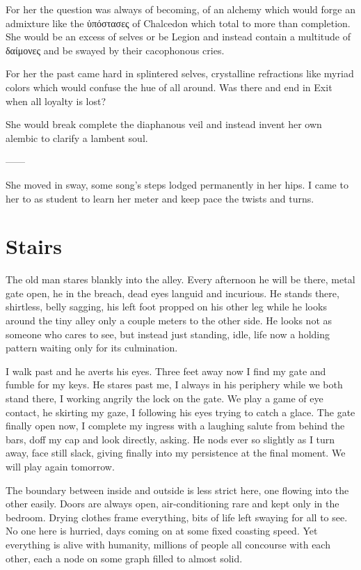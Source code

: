 \documentclass[ebook, 10pt, openright, onecolumn]{memoir}
\newcommand{\textgreek}[1]{\begingroup\fontencoding{LGR}\selectfont#1\endgroup}
\begin{document}
For her the question was always of becoming, of an alchemy which would forge an
admixture like the \textgreek{ὑπόστασες} of Chalcedon which total to more than
completion.  She would be an excess of selves or be Legion and instead contain a
multitude of \textgreek{δαίμονες} and be swayed by their cacophonous cries. 

For her the past came hard in splintered selves, crystalline refractions like
myriad colors which would confuse the hue of all around.  Was there and end in
Exit when all loyalty is lost?

She would break complete the diaphanous veil and instead invent her own alembic
to clarify a lambent soul.

------

She moved in sway, some song's steps lodged permanently in her hips.  I came to
her to as student to learn her meter and keep pace the twists and turns.  

\chapter{Stairs}
\label{cha:stairs}

The old man stares blankly into the alley. Every afternoon he will be there,
metal gate open, he in the breach, dead eyes languid and incurious.  He stands
there, shirtless, belly sagging, his left foot propped on his other leg while he
looks around the tiny alley only a couple meters to the other side.  He looks
not as someone who cares to see, but instead just standing, idle, life now a
holding pattern waiting only for its culmination.

I walk past and he averts his eyes.  Three feet away now I find my gate and
fumble for my keys.  He stares past me, I always in his periphery while we both
stand there, I working angrily the lock on the gate.  We play a game of eye
contact, he skirting my gaze, I following his eyes trying to catch a glace.  The
gate finally open now, I complete my ingress with a laughing salute from behind the
bars, doff my cap and look directly, asking.  He nods ever so slightly as I turn
away, face still slack, giving finally into my persistence at the final
moment.  We will play again tomorrow. 

The boundary between inside and outside is less strict here, one flowing into
the other easily.  Doors are always open, air-conditioning rare and kept only in
the bedroom.  Drying clothes frame everything, bits of life left swaying for all
to see.  No one here is hurried, days coming on at some fixed coasting
speed. Yet everything is alive with humanity, millions of people all 
concourse with each other, each a node on some graph filled to almost solid.
\end{document}
